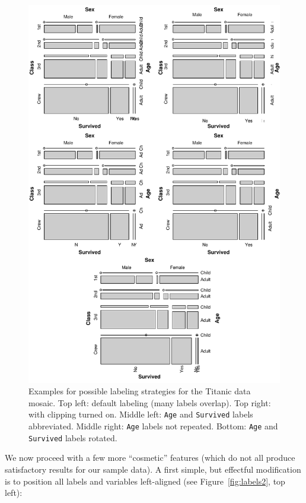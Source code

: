 \documentclass{Z}
\begin{document}
\begin{figure}[p]
\begin{center}
\includegraphics{strucplot-label1fig}
\caption{Examples for possible labeling strategies for the Titanic data mosaic. 
  Top left: default labeling (many labels overlap). 
  Top right: with clipping turned on. Middle left: \texttt{Age} and
  \texttt{Survived} labels abbreviated. Middle right: \texttt{Age} labels
  not repeated. Bottom: \texttt{Age} and \texttt{Survived} labels rotated.}
\label{fig:labels1}
\end{center}
\end{figure}

We now proceed with a few more ``cosmetic'' features (which do not all
produce satisfactory results for our sample data).
A first simple, but effectful modification is to position
all labels and variables left-aligned (see Figure~\ref{fig:labels2},
top left):
\end{document}

